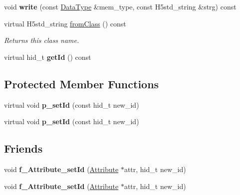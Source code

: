 \begin{DoxyCompactItemize}
\item 
\mbox{\label{class_h5_1_1_attribute_a751c54bde214b2a9d028dc41dc7ad209}} 
void {\bfseries write} (const \hyperlink{class_h5_1_1_data_type}{Data\+Type} \&mem\+\_\+type, const H5std\+\_\+string \&strg) const
\item 
\mbox{\label{class_h5_1_1_attribute_a2ede405f542c51aebc38cfcadfdd7d95}} 
virtual H5std\+\_\+string \hyperlink{class_h5_1_1_attribute_a2ede405f542c51aebc38cfcadfdd7d95}{from\+Class} () const
\begin{DoxyCompactList}\small\item\em Returns this class name. \end{DoxyCompactList}\item 
\mbox{\label{class_h5_1_1_attribute_ade26b6838cefaeab54f847b862fcc87d}} 
virtual hid\+\_\+t {\bfseries get\+Id} () const
\end{DoxyCompactItemize}
\subsection*{Protected Member Functions}
\begin{DoxyCompactItemize}
\item 
\mbox{\label{class_h5_1_1_attribute_ac2f3d3cb16ba3a997e449bb8c271b1d8}} 
virtual void {\bfseries p\+\_\+set\+Id} (const hid\+\_\+t new\+\_\+id)
\item 
\mbox{\label{class_h5_1_1_attribute_ac2f3d3cb16ba3a997e449bb8c271b1d8}} 
virtual void {\bfseries p\+\_\+set\+Id} (const hid\+\_\+t new\+\_\+id)
\end{DoxyCompactItemize}
\subsection*{Friends}
\begin{DoxyCompactItemize}
\item 
\mbox{\label{class_h5_1_1_attribute_a0c8380480ed8047f97833abe159bd4dc}} 
void {\bfseries f\+\_\+\+Attribute\+\_\+set\+Id} (\hyperlink{class_h5_1_1_attribute}{Attribute} $\ast$attr, hid\+\_\+t new\+\_\+id)
\item 
\mbox{\label{class_h5_1_1_attribute_a0c8380480ed8047f97833abe159bd4dc}} 
void {\bfseries f\+\_\+\+Attribute\+\_\+set\+Id} (\hyperlink{class_h5_1_1_attribute}{Attribute} $\ast$attr, hid\+\_\+t new\+\_\+id)
\end{DoxyCompactItemize}
